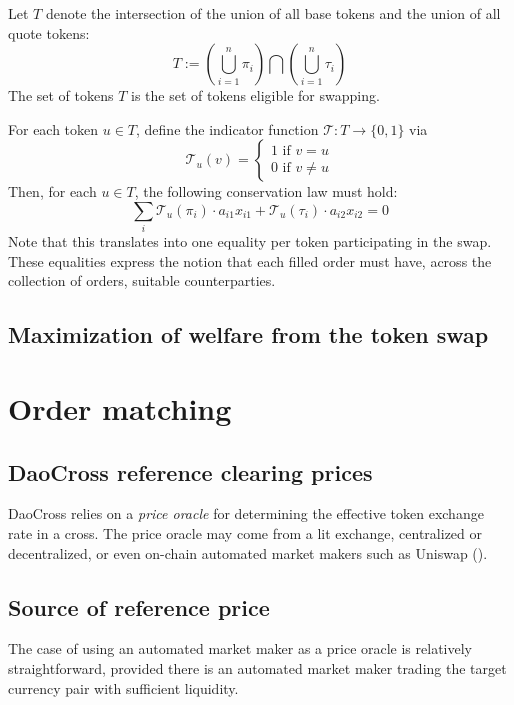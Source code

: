 \documentclass[11pt, reqno]{amsart}
\theoremstyle{definition}
\theoremstyle{remark}
\begin{document}
Let $T$ denote the intersection of the union of all base tokens and the union
of all quote tokens:
\[
	T :=
    \left( \bigcup_{i=1}^n \pi_i \right)
	\bigcap
    \left( \bigcup_{i=1}^n \tau_i \right)
\]
The set of tokens $T$ is the set of tokens eligible for swapping.

For each token $u \in T$, define the indicator function
$\mathcal{T}: T \to \{0, 1\}$ via
\[
	\mathcal{T}_u(v) =
	\begin{cases}
		1 \text{ if } v = u \\
		0 \text{ if } v \neq u
	\end{cases}
\]
Then, for each $u \in T$, the following conservation law must hold:
\[
    \sum_i \mathcal{T}_u(\pi_i) \cdot a_{i1} x_{i1}
    + \mathcal{T}_u(\tau_i) \cdot a_{i2} x_{i2}
    = 0
\]
Note that this translates into one equality per token participating in the
swap. These equalities express the notion that each filled order must have,
across the collection of orders, suitable counterparties.

\subsection{Maximization of welfare from the token swap}

\section{Order matching}

\subsection{DaoCross reference clearing prices}
DaoCross relies on a \emph{price oracle} for determining the effective
token exchange rate in a cross. The price oracle may come from a lit
exchange, centralized or decentralized, or even on-chain automated market
makers such as Uniswap (\cite[\S 2.2]{AdZiRo20}).

\subsection{Source of reference price}
The case of using an automated market maker as a price oracle is relatively
straightforward, provided there is an automated market maker trading the
target currency pair with sufficient liquidity.
\end{document}
